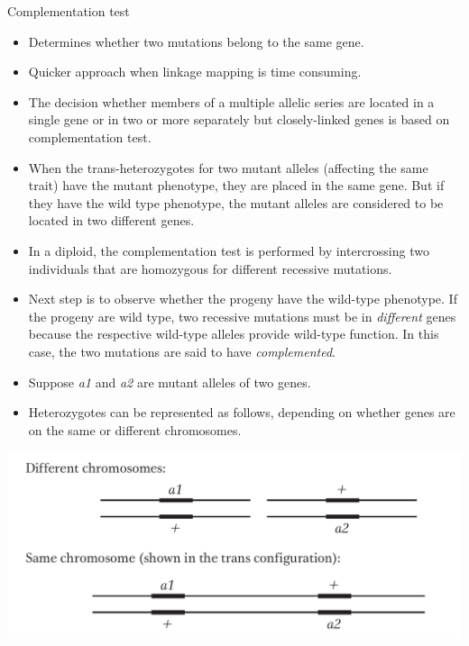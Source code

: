 \documentclass[11pt,dvipsnames,ignorenonframetext,aspectratio=169]{beamer}
\providecommand{\tightlist}{%
  \setlength{\itemsep}{0pt}\setlength{\parskip}{0pt}}
\begin{document}
\begin{frame}{Complementation test}
\protect\hypertarget{complementation-test}{}
\begin{itemize}
\tightlist
\item
  Determines whether two mutations belong to the same gene.
\item
  Quicker approach when linkage mapping is time consuming.
\item
  The decision whether members of a multiple allelic series are located
  in a single gene or in two or more separately but closely-linked genes
  is based on complementation test.
\item
  When the trans-heterozygotes for two mutant alleles (affecting the
  same trait) have the mutant phenotype, they are placed in the same
  gene. But if they have the wild type phenotype, the mutant alleles are
  considered to be located in two different genes.
\end{itemize}
\end{frame}

\begin{frame}{}
\protect\hypertarget{section-25}{}
\begin{itemize}
\tightlist
\item
  In a diploid, the complementation test is performed by intercrossing
  two individuals that are homozygous for different recessive mutations.
\item
  Next step is to observe whether the progeny have the wild-type
  phenotype. If the progeny are wild type, two recessive mutations must
  be in \emph{different} genes because the respective wild-type alleles
  provide wild-type function. In this case, the two mutations are said
  to have \emph{complemented}.
\item
  Suppose \emph{a1} and \emph{a2} are mutant alleles of two genes.
\item
  Heterozygotes can be represented as follows, depending on whether
  genes are on the same or different chromosomes.
\end{itemize}

\begin{center}\includegraphics[width=0.35\linewidth]{./../images/gene_location_chromosomes} \end{center}
\end{frame}
\end{document}
